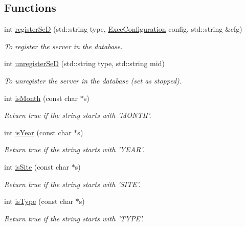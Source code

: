\subsection*{Functions}
\begin{DoxyCompactItemize}
\item 
int \hyperlink{namespacevishnu_a9f137bd109d564a7366b3a847581d7f6}{registerSeD} (std::string type, \hyperlink{classExecConfiguration}{ExecConfiguration} config, std::string \&cfg)
\begin{DoxyCompactList}\small\item\em To register the server in the database. \item\end{DoxyCompactList}\item 
int \hyperlink{namespacevishnu_ac55cf69f136045543c4586d42e3731a7}{unregisterSeD} (std::string type, std::string mid)
\begin{DoxyCompactList}\small\item\em To unregister the server in the database (set as stopped). \item\end{DoxyCompactList}\item 
int \hyperlink{namespacevishnu_ae3f61f1465ef34d3cf2f20c67a019b43}{isMonth} (const char $\ast$s)
\begin{DoxyCompactList}\small\item\em Return true if the string starts with 'MONTH'. \item\end{DoxyCompactList}\item 
int \hyperlink{namespacevishnu_a646794297931366c08502e5079154ccd}{isYear} (const char $\ast$s)
\begin{DoxyCompactList}\small\item\em Return true if the string starts with 'YEAR'. \item\end{DoxyCompactList}\item 
int \hyperlink{namespacevishnu_a36b8edc2218c332a4a59f2e39109d627}{isSite} (const char $\ast$s)
\begin{DoxyCompactList}\small\item\em Return true if the string starts with 'SITE'. \item\end{DoxyCompactList}\item 
int \hyperlink{namespacevishnu_abaf2c02608b3d96f1f883d65966595a5}{isType} (const char $\ast$s)
\begin{DoxyCompactList}\small\item\em Return true if the string starts with 'TYPE'. \item\end{DoxyCompactList}\item 

\end{DoxyCompactItemize}
